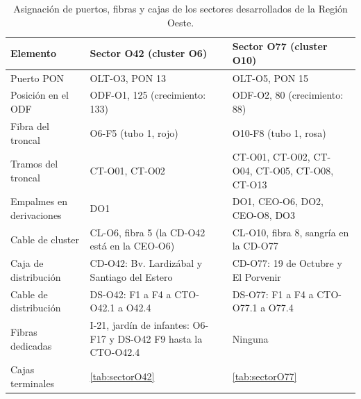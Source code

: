 \begin{table}[H]
    \centering
    \footnotesize
    \caption{Asignación de puertos, fibras y cajas de los sectores desarrollados de la Región Oeste.}
    \label{tab:continuidad_O}
    \begin{tabular}{|l|p{5.6cm}|p{5.6cm}|}
        \hline
        \textbf{Elemento} & \textbf{Sector O42 (cluster O6)} & \textbf{Sector O77 (cluster O10)} \\
        \hline
        Puerto PON & OLT-O3, PON 13 & OLT-O5, PON 15 \\
        Posición en el ODF & ODF-O1, 125 (crecimiento: 133) & ODF-O2, 80 (crecimiento: 88) \\
        Fibra del troncal & O6-F5 (tubo 1, rojo) & O10-F8 (tubo 1, rosa) \\
        Tramos del troncal & CT-O01, CT-O02 & CT-O01, CT-O02, CT-O04, CT-O05, CT-O08, CT-O13 \\
        Empalmes en derivaciones & DO1 & DO1, CEO-O6, DO2, CEO-O8, DO3 \\
        Cable de cluster & CL-O6, fibra 5 (la CD-O42 está en la CEO-O6) & CL-O10, fibra 8, sangría en la CD-O77 \\
        Caja de distribución & CD-O42: Bv. Lardizábal y Santiago del Estero & CD-O77: 19 de Octubre y El Porvenir \\
        Cable de distribución & DS-O42: F1 a F4 a CTO-O42.1 a O42.4 & DS-O77: F1 a F4 a CTO-O77.1 a O77.4 \\
        Fibras dedicadas & I-21, jardín de infantes: O6-F17 y DS-O42 F9 hasta la CTO-O42.4 & Ninguna \\
        Cajas terminales & \autoref{tab:sectorO42} & \autoref{tab:sectorO77} \\
        \hline
    \end{tabular}
\end{table}
